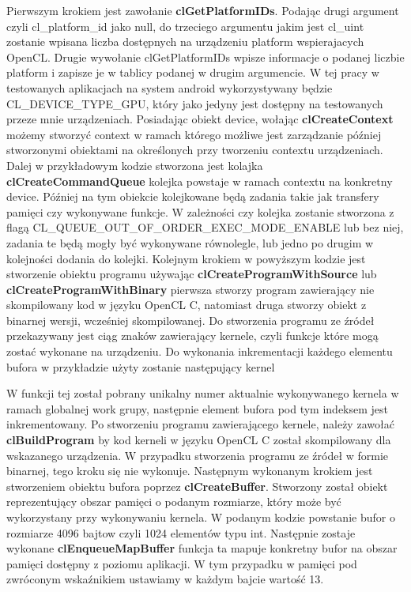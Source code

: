 Pierwszym krokiem jest zawołanie \textbf{clGetPlatformIDs}. Podając drugi argument czyli cl\_platform\_id\* jako null, do trzeciego argumentu jakim jest cl\_uint\* zostanie wpisana liczba dostępnych na urządzeniu platform wspierajacych OpenCL.
Drugie wywołanie clGetPlatformIDs wpisze informacje o podanej liczbie platform i zapisze je w tablicy podanej w drugim argumencie.
W tej pracy w testowanych aplikacjach na system android wykorzystywany będzie CL\_DEVICE\_TYPE\_GPU, który jako jedyny jest dostępny na testowanych przeze mnie urządzeniach.
Posiadając obiekt device, wołając \textbf{clCreateContext} możemy stworzyć context w ramach którego możliwe jest zarządzanie później stworzonymi obiektami na określonych przy tworzeniu contextu urządzeniach. 
Dalej w przykładowym kodzie stworzona jest kolajka \textbf{clCreateCommandQueue} kolejka powstaje w ramach contextu na konkretny device. Później na tym obiekcie kolejkowane będą zadania takie jak transfery pamięci czy wykonywane funkcje. W zależności czy kolejka zostanie stworzona z flagą CL\_QUEUE\_OUT\_OF\_ORDER\_EXEC\_MODE\_ENABLE lub bez niej, zadania te będą mogły być wykonywane równolegle, lub jedno po drugim w kolejności dodania do kolejki.
Kolejnym krokiem w powyższym kodzie jest stworzenie obiektu programu używając \textbf{clCreateProgramWithSource} lub \textbf{clCreateProgramWithBinary} pierwsza stworzy program zawierający nie skompilowany kod w języku OpenCL C, natomiast druga stworzy obiekt z binarnej wersji, wcześniej skompilowanej. Do stworzenia programu ze źródeł przekazywany jest ciąg znaków zawierający kernele, czyli funkcje które mogą zostać wykonane na urządzeniu.
Do wykonania inkrementacji każdego elementu bufora w przykładzie użyty zostanie następujący kernel

W funkcji tej został pobrany unikalny numer aktualnie wykonywanego kernela w ramach globalnej work grupy, następnie element bufora pod tym indeksem jest inkrementowany. 
Po stworzeniu programu zawierającego kernele, należy zawołać \textbf{clBuildProgram} by kod kerneli w języku OpenCL C został skompilowany dla wskazanego urządzenia. W przypadku stworzenia programu ze źródeł w formie binarnej, tego kroku się nie wykonuje.
Następnym wykonanym krokiem jest stworzeniem obiektu bufora poprzez \textbf{clCreateBuffer}. Stworzony został obiekt reprezentujący obszar pamięci o podanym rozmiarze, który może być wykorzystany przy wykonywaniu kernela. W podanym kodzie powstanie bufor o rozmiarze 4096 bajtow czyli 1024 elementów typu int.
Następnie zostaje wykonane \textbf{clEnqueueMapBuffer} funkcja ta mapuje konkretny bufor na obszar pamięci dostępny z poziomu aplikacji. W tym przypadku w pamięci pod zwróconym wskaźnikiem ustawiamy w każdym bajcie wartość 13.
